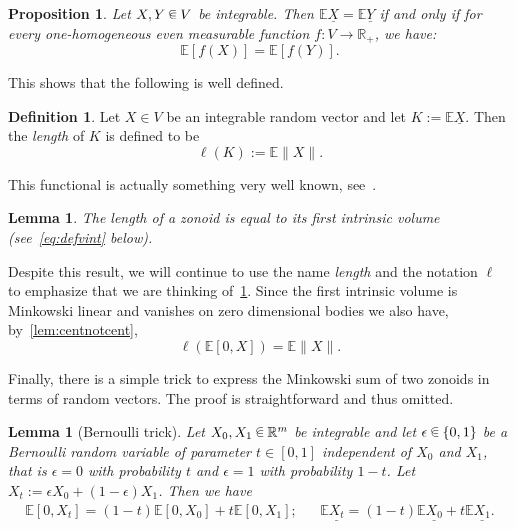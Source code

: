 \documentclass[10pt]{amsart}
\newtheorem{lemm}[theo]{Lemma}\newtheorem{prop}[theo]{Proposition}\newtheorem{coro}[theo]{Corollary}\newtheorem{conj}[theo]{Conjecture}
\theoremstyle{definition}\newtheorem{defi}[theo]{Definition}\newtheorem{rema}[theo]{Remark}\newtheorem{exam}[theo]{Example}\newtheorem{exem}[theo]{Example}\newtheorem{nota}[theo]{Notation}
\newcommand{\R}{\mathbb{R}}
\newcommand{\EE}{\mathbb{E}}
\newcommand{\seg}{\underline}
\newcommand*\randin{
\mathchoice {\raisebox{-.35ex}{$\displaystyle{^\subset}$}\mkern-11.5mu\raisebox{+.45ex}{$\displaystyle{_\subset}$}} {\mkern+1mu\raisebox{-.27ex}{$\textstyle{^\subset}$}\mkern-11.7mu\raisebox{+.45ex}{$\textstyle{_\subset}$}} {\raisebox{.35ex}{$\scriptstyle\subset$}\mkern-14mu\raisebox{-.15ex}{$\scriptstyle\subset$}} {\raisebox{.3ex}{$\scriptscriptstyle\subset$}\mkern-13.5mu\raisebox{-.10ex}{$\scriptscriptstyle\subset$}}}
\begin{document}
\begin{prop}\label{prop:zoneq}
Let $X,Y\,\randin\, V$ be integrable. Then $\EE\seg{X}=\EE\seg{Y}$ if and only if for every one-homogeneous even measurable function $f: V\to \R_+$, we have:
\begin{equation*}
\EE \left[f(X)\right]=\EE \left[f(Y)\right].
\end{equation*}
\end{prop}

This shows that the following is well defined.

\begin{defi}\label{def:zlength}
Let $X\in V$ be an integrable random vector and let $K:=\EE\seg{X}$. Then the \emph{length} of $K$ is defined to be
\begin{equation*}
\ell(K):=\EE\|X\|.
\end{equation*}
\end{defi}

This functional is actually something very well known, see~\cite[Theorem~5.2]{ZA}.
\begin{lemm}
The length of a zonoid is equal to its first intrinsic volume (see~\eqref{eq:defvint} below).
\end{lemm}

Despite this result, we will continue to use the name \emph{length} and the notation $\ell$ to emphasize that we are thinking of~\cref{def:zlength}. Since the first intrinsic volume is Minkowski linear and vanishes on zero dimensional bodies we also have, by~\cref{lem:centnotcent},
\begin{equation}\label{eq:lengthnorm}
\ell(\EE[0,X])=\EE\|X\|.
\end{equation}

Finally, there is a simple trick to express the Minkowski sum of two zonoids in terms of random vectors. The proof is straightforward and thus omitted.

\begin{lemm}[Bernoulli trick]
Let $X_0,X_1\,\randin\,\R^m$ be integrable and let $\epsilon\,\randin\,\{0,1\}$ be a Bernoulli random variable of parameter $t\in[0,1]$ independent of $X_0$ and $X_1$, that is $\epsilon=0$ with probability $t$ and $\epsilon=1$ with probability $1-t$. Let $X_t:=\epsilon X_0 + (1-\epsilon)X_1$. Then we have
\begin{align*}
\EE[0,X_t]=(1-t)\EE[0,X_0]+t\EE[0,X_1]; && \EE\seg{X_t}=(1-t)\EE\seg{X_0}+t\EE\seg{X_1}.
\end{align*}
\end{lemm}
\end{document}
